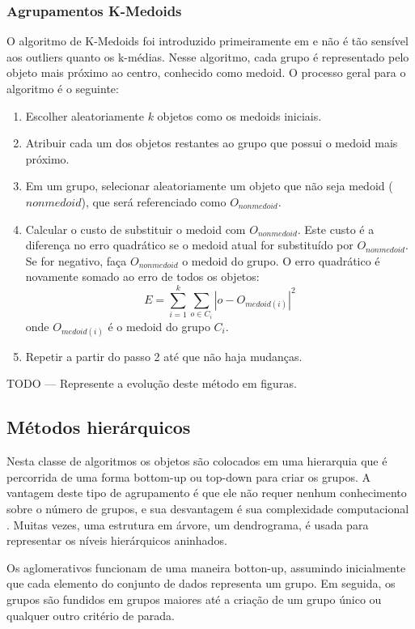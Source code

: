 \subsubsection{Agrupamentos K-Medoids}
O algoritmo de K-Medoids foi introduzido primeiramente em \cite{kaufmann1990} e não é tão sensível aos outliers quanto os k-médias. Nesse algoritmo, cada grupo é representado pelo objeto mais próximo ao centro, conhecido como medoid.
O processo geral para o algoritmo é o seguinte:
 \begin{enumerate}
 	\item Escolher aleatoriamente ${k}$ objetos como os medoids iniciais.
 	\item Atribuir cada um dos objetos restantes ao grupo que possui o medoid mais próximo.
 	\item Em um grupo, selecionar aleatoriamente um objeto que não seja medoid (${nonmedoid}$), que será referenciado como ${O_{nonmedoid}}$.
 	\item Calcular o custo de substituir o medoid com ${O_{nonmedoid}}$. Este custo é a diferença no erro quadrático se o medoid atual for substituído por ${O_{nonmedoid}}$. Se for negativo, faça ${O_{nonmedoid}}$ o medoid do grupo. O erro quadrático é novamente somado ao erro de todos os objetos:
 	\begin{equation}
 	E = \sum_{i=1}^{k}\sum_{o\in C_{i}} |o - O_{medoid(i)}|^{2}
 	\end{equation}
 	onde ${O_{medoid(i)}}$ é o medoid do grupo ${C_{i}}$.
 	\item Repetir a partir do passo 2 até que não haja mudanças. 
 \end{enumerate}
TODO --- Represente a evolução deste método em figuras.

\subsection{Métodos hierárquicos}
Nesta classe de algoritmos os objetos são colocados em uma hierarquia que é percorrida de uma forma bottom-up ou top-down para criar os grupos. A vantagem deste tipo de agrupamento é que ele não requer nenhum conhecimento sobre o número de grupos, e sua desvantagem é sua complexidade computacional \cite{Lin2004}. Muitas vezes, uma estrutura em árvore, um dendrograma, é usada para representar os níveis hierárquicos aninhados.

Os aglomerativos funcionam de uma maneira botton-up,
assumindo inicialmente que cada elemento do conjunto de dados representa um grupo. Em seguida, os grupos são fundidos em grupos maiores até a criação de um grupo único ou qualquer outro critério de parada.

